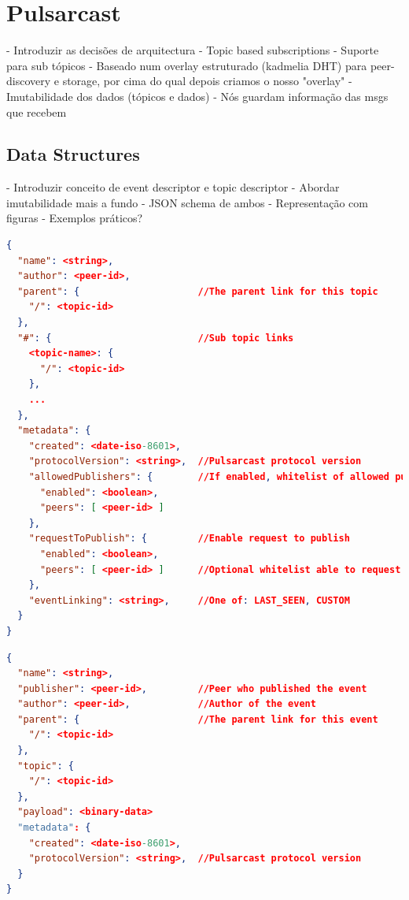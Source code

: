 
\chapter{Pulsarcast}
\label{chapter:pulsarcast}

- Introduzir as decisões de arquitectura
  - Topic based subscriptions
  - Suporte para sub tópicos
  - Baseado num overlay estruturado (kadmelia DHT) para peer-discovery e
  storage, por cima do qual depois criamos o nosso "overlay"
  - Imutabilidade dos dados (tópicos e dados)
  - Nós guardam informação das msgs que recebem


\section{Data Structures}
- Introduzir conceito de event descriptor e topic descriptor
- Abordar imutabilidade mais a fundo
- JSON schema de ambos
- Representação com figuras
- Exemplos práticos?

\begin{lstlisting}[language=JSON,caption={Topic descriptor schema in a JSON based format},label={topic-descriptor},captionpos=b]
{
  "name": <string>,
  "author": <peer-id>,
  "parent": {                     //The parent link for this topic
    "/": <topic-id>
  },
  "#": {                          //Sub topic links
    <topic-name>: {
      "/": <topic-id>
    },
    ...
  },
  "metadata": {
    "created": <date-iso-8601>,
    "protocolVersion": <string>,  //Pulsarcast protocol version
    "allowedPublishers": {        //If enabled, whitelist of allowed publishers
      "enabled": <boolean>,
      "peers": [ <peer-id> ]
    },
    "requestToPublish": {         //Enable request to publish
      "enabled": <boolean>,
      "peers": [ <peer-id> ]      //Optional whitelist able to request
    },
    "eventLinking": <string>,     //One of: LAST_SEEN, CUSTOM
  }
}
\end{lstlisting}

\begin{lstlisting}[language=JSON,caption={Event descriptor schema in a JSON based format},label={event-descriptor},captionpos=b]
{
  "name": <string>,
  "publisher": <peer-id>,         //Peer who published the event
  "author": <peer-id>,            //Author of the event
  "parent": {                     //The parent link for this event
    "/": <topic-id>
  },
  "topic": {
    "/": <topic-id>
  },
  "payload": <binary-data>
  "metadata": {
    "created": <date-iso-8601>,
    "protocolVersion": <string>,  //Pulsarcast protocol version
  }
}
\end{lstlisting}

